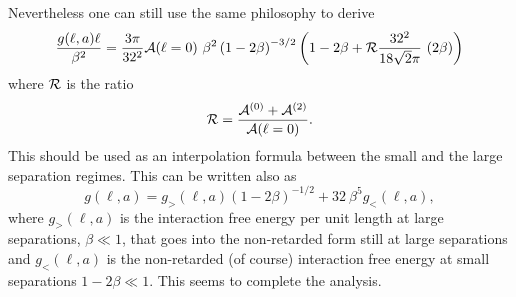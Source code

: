 \documentclass[onecolumn,letterpaper,amsmath,amssymb,floatfix,aps,superscriptaddress]{revtex4}
\begin{document}
Nevertheless one can still use the same philosophy to derive
\begin{equation}
\frac{g(\ell,a) \ell}{\beta^2} = \frac{3 \pi}{32^2} {\cal A}(\ell = 0) ~\beta^2  \left( 1 - 2 \beta\right)^{-3/2} \left( 1 - 2 \beta + {\cal R} \frac{32^2 }{18 \sqrt2 \pi} ~ (2 \beta) \right)
\end{equation}
where $\cal R$ is the ratio
\begin{equation}
{\cal R} = \frac{{\cal A}^{(0)}+{\cal A}^{(2)}}{{\cal A}(\ell = 0)}.
\end{equation}
This should be used as an interpolation formula between the small and the large separation regimes. This can be written also as
\begin{equation}
g(\ell,a) = g_{>}(\ell,a) \left( 1 - 2 \beta\right)^{-1/2} + {32~ \beta^5} g_{<}(\ell,a),
\end{equation}
where $g_{>}(\ell,a)$ is the interaction free energy per unit length at large separations, $\beta \ll 1$, that goes into the non-retarded form still at large separations and $g_{<}(\ell,a) $ is the non-retarded (of course) interaction free energy at small separations $1- 2\beta \ll 1$. This seems to complete the analysis.
\end{document}
